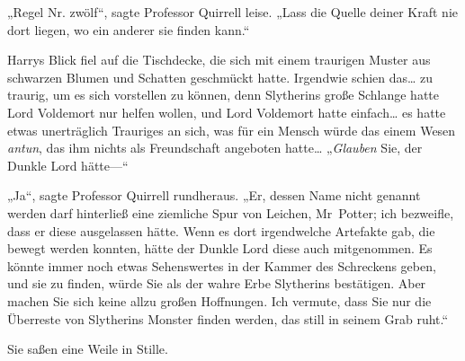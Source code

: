 „Regel Nr. zwölf“, sagte Professor Quirrell leise. „Lass die Quelle deiner Kraft nie dort liegen, wo ein anderer sie finden kann.“

Harrys Blick fiel auf die Tischdecke, die sich mit einem traurigen Muster aus schwarzen Blumen und Schatten geschmückt hatte. Irgendwie schien das… zu traurig, um es sich vorstellen zu können, denn Slytherins große Schlange hatte Lord Voldemort nur helfen wollen, und Lord Voldemort hatte einfach… es hatte etwas unerträglich Trauriges an sich, was für ein Mensch würde das einem Wesen \emph{antun}, das ihm nichts als Freundschaft angeboten hatte… „\emph{Glauben} Sie, der Dunkle Lord hätte—“

„Ja“, sagte Professor Quirrell rundheraus. „Er, dessen Name nicht genannt werden darf hinterließ eine ziemliche Spur von Leichen, Mr~Potter; ich bezweifle, dass er diese ausgelassen hätte. Wenn es dort irgendwelche Artefakte gab, die bewegt werden konnten, hätte der Dunkle Lord diese auch mitgenommen. Es könnte immer noch etwas Sehenswertes in der Kammer des Schreckens geben, und sie zu finden, würde Sie als der wahre Erbe Slytherins bestätigen. Aber machen Sie sich keine allzu großen Hoffnungen. Ich vermute, dass Sie nur die Überreste von Slytherins Monster finden werden, das still in seinem Grab ruht.“

Sie saßen eine Weile in Stille.

